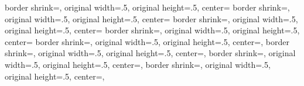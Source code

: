 %
%
%
%
%
%
%
{%
	\edef\pgfpageoptionheight{\the\paperheight}%
	\edef\pgfpageoptionwidth{\the\paperwidth}%
	\edef\pgfpageoptionborder{1pt}%
}
{%
  {%
    border shrink=\pgfpageoptionborder,%
	original width=.5\pgfpageoptionheight,%
	original height=.5\pgfpageoptionwidth,%
    center=\pgfpoint{0\pgfphysicalwidth}{\pgfphysicalheight}%
  }%
  {%
    border shrink=\pgfpageoptionborder,%
	original width=.5\pgfpageoptionheight,%
	original height=.5\pgfpageoptionwidth,%
    center=\pgfpoint{.5\pgfphysicalwidth}{\pgfphysicalheight}%
  }%
  {%
    border shrink=\pgfpageoptionborder,%
	original width=.5\pgfpageoptionheight,%
	original height=.5\pgfpageoptionwidth,%
    center=\pgfpoint{0\pgfphysicalwidth}{.5\pgfphysicalheight}%
  }%
  {%
    border shrink=\pgfpageoptionborder,%
	original width=.5\pgfpageoptionheight,%
	original height=.5\pgfpageoptionwidth,%
    center=\pgfpoint{.5\pgfphysicalwidth}{.5\pgfphysicalheight}%
  }%
  {%
  	border shrink=\pgfpageoptionborder,%
	original width=.5\pgfpageoptionheight,%
	original height=.5\pgfpageoptionwidth,%
    center=\pgfpoint{.5\pgfphysicalwidth}{\pgfphysicalheight},%
  }%
  {%
  	border shrink=\pgfpageoptionborder,%
	original width=.5\pgfpageoptionheight,%
	original height=.5\pgfpageoptionwidth,%
    center=\pgfpoint{0\pgfphysicalwidth}{\pgfphysicalheight},%
  }%
  {%
	border shrink=\pgfpageoptionborder,%
	original width=.5\pgfpageoptionheight,%
	original height=.5\pgfpageoptionwidth,%
    center=\pgfpoint{.5\pgfphysicalwidth}{.5\pgfphysicalheight},%
  }%
  {%
	border shrink=\pgfpageoptionborder,%
	original width=.5\pgfpageoptionheight,%
	original height=.5\pgfpageoptionwidth,%
    center=\pgfpoint{0\pgfphysicalwidth}{.5\pgfphysicalheight},%
  }%
}%